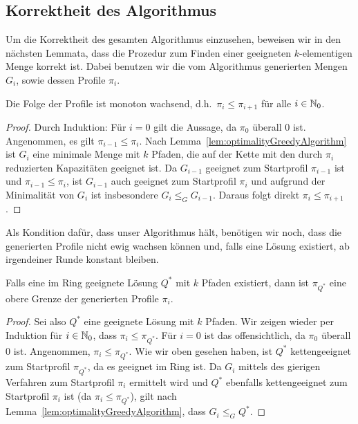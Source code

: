 \subsection{Korrektheit des Algorithmus}\label{subsec:korrektheitCallControlInRings}
Um die Korrektheit des gesamten Algorithmus einzusehen, beweisen wir in den nächsten Lemmata, dass die Prozedur zum
Finden einer geeigneten $k$-elementigen Menge korrekt ist.
Dabei benutzen wir die vom Algorithmus generierten Mengen $G_i$, sowie dessen Profile $\pi_i$.

\begin{lemma}\label{lem:monotonousProfiles}
    Die Folge der Profile ist monoton wachsend, d.h.\ $\pi_i \leq \pi_{i+1}$ für alle $i \in \mathbb N_0$.
\end{lemma}
\begin{proof}
    Durch Induktion: Für $i=0$ gilt die Aussage, da $\pi_0$ überall 0 ist.
    Angenommen, es gilt $\pi_{i-1} \leq \pi_i$.
    Nach Lemma~\ref{lem:optimalityGreedyAlgorithm} ist $G_{i}$ eine minimale Menge mit $k$ Pfaden, die auf der Kette mit den durch $\pi_{i}$
    reduzierten Kapazitäten geeignet ist.
    Da $G_{i-1}$ geeignet zum Startprofil $\pi_{i-1}$ ist und $\pi_{i-1} \leq \pi_i$, ist $G_{i-1}$ auch
    geeignet zum Startprofil $\pi_{i}$ und aufgrund der Minimalität von $G_i$ ist insbesondere $G_i \leq_G G_{i-1}$.
    Daraus folgt direkt $\pi_i \leq \pi_{i+1}$.
\end{proof}

Als Kondition dafür, dass unser Algorithmus hält, benötigen wir noch, dass die generierten Profile nicht
ewig wachsen können und, falls eine Lösung existiert, ab irgendeiner Runde konstant bleiben.

\begin{lemma}\label{lem:upperBoundProfiles}
    Falls eine im Ring geeignete Lösung $Q^*$ mit $k$ Pfaden existiert, dann ist $\pi_{Q^*}$ eine obere Grenze der
    generierten Profile $\pi_i$.
\end{lemma}
\begin{proof}
    Sei also $Q^*$ eine geeignete Lösung mit $k$ Pfaden.
    Wir zeigen wieder per Induktion für $i \in \mathbb N_0$, dass $\pi_i \leq \pi_{Q^*}$.
    Für $i=0$ ist das offensichtlich, da $\pi_0$ überall 0 ist.
    Angenommen, $\pi_i \leq \pi_{Q^*}$.
    Wie wir oben gesehen haben, ist $Q^*$ kettengeeignet zum Startprofil $\pi_{Q^*}$, da es geeignet im Ring ist.
    Da $G_{i}$ mittels des gierigen Verfahren zum Startprofil $\pi_i$ ermittelt wird und $Q^*$ ebenfalls kettengeeignet
    zum Startprofil $\pi_i$ ist (da $\pi_i \leq \pi_{Q^*}$), gilt nach Lemma~\ref{lem:optimalityGreedyAlgorithm}, dass $G_{i} \leq_G Q^*$.
\end{proof}

